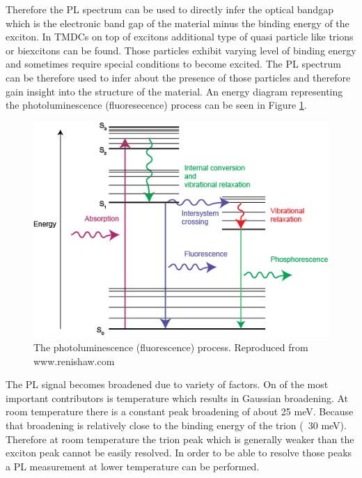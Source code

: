 Therefore the PL spectrum can be used to directly infer the optical bandgap which is the electronic band gap of the material minus the binding energy of the exciton. In TMDCs on top of excitons additional type of quasi particle like trions or biexcitons can be found. Those particles exhibit varying level of binding energy and sometimes require special conditions to become excited. The PL spectrum can be therefore used to infer about the presence of those particles and therefore gain insight into the structure of the material. An energy diagram representing the photoluminescence (fluoresecence) process can be seen in Figure \ref{fig:MethodologyPLDiagram}.

\begin{figure}[!h]
	\begin{center}
		\includegraphics[scale=0.7]{Methodology/PLDiagram.png}
		\caption{The photoluminescence (fluorescence) process. Reproduced from www.renishaw.com}
		\label{fig:MethodologyPLDiagram}
	\end{center}
\end{figure}

The PL signal becomes broadened due to variety of factors. On of the most important contributors is temperature which results in Gaussian broadening. At room temperature there is a constant peak broadening of about 25 meV. Because that broadening is relatively close to the binding energy of the trion (~30 meV). Therefore at room temperature the trion peak which is generally weaker than the exciton peak cannot be easily resolved. In order to be able to resolve those peaks a PL measurement at lower temperature can be performed.

